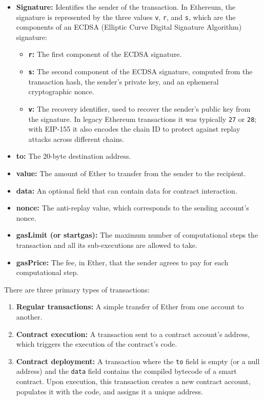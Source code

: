 \documentclass{scrbook}
\begin{document}
\begin{itemize}
    \item \textbf{Signature:} Identifies the sender of the transaction. In Ethereum, the signature is represented by the three values \texttt{v}, \texttt{r}, and \texttt{s}, which are the components of an ECDSA (Elliptic Curve Digital Signature Algorithm) signature:
    \begin{itemize}
        \item \textbf{\texttt{r}:} The first component of the ECDSA signature.
        \item \textbf{\texttt{s}:} The second component of the ECDSA signature, computed from the transaction hash, the sender's private key, and an ephemeral cryptographic nonce.
        \item \textbf{\texttt{v}:} The recovery identifier, used to recover the sender's public key from the signature. In legacy Ethereum transactions it was typically \texttt{27} or \texttt{28}; with EIP-155 it also encodes the chain ID to protect against replay attacks across different chains.
    \end{itemize}
    \item \textbf{to:} The 20-byte destination address.
    \item \textbf{value:} The amount of Ether to transfer from the sender to the recipient.
    \item \textbf{data:} An optional field that can contain data for contract interaction.
    \item \textbf{nonce:} The anti-replay value, which corresponds to the sending account's nonce.
    \item \textbf{gasLimit (or startgas):} The maximum number of computational steps the transaction and all its sub-executions are allowed to take.
    \item \textbf{gasPrice:} The fee, in Ether, that the sender agrees to pay for each computational step.
\end{itemize}

There are three primary types of transactions:

\begin{enumerate}
    \item \textbf{Regular transactions:} A simple transfer of Ether from one account to another.
    \item \textbf{Contract execution:} A transaction sent to a contract account's address, which triggers the execution of the contract's code.
    \item \textbf{Contract deployment:} A transaction where the \texttt{to} field is empty (or a null address) and the \texttt{data} field contains the compiled bytecode of a smart contract. Upon execution, this transaction creates a new contract account, populates it with the code, and assigns it a unique address.
\end{enumerate}
\end{document}
